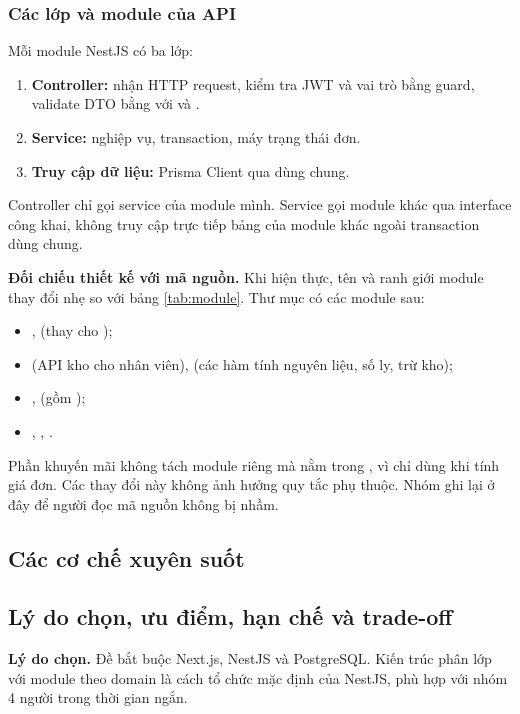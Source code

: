 \subsubsection{Các lớp và module của API}
Mỗi module NestJS có ba lớp:
\begin{enumerate}
\item \textbf{Controller:} nhận HTTP request, kiểm tra JWT và vai trò bằng guard, validate DTO bằng  với  và .
\item \textbf{Service:} nghiệp vụ, transaction, máy trạng thái đơn.
\item \textbf{Truy cập dữ liệu:} Prisma Client qua  dùng chung.
\end{enumerate}

Controller chỉ gọi service của module mình. Service gọi module khác qua interface công khai, không truy cập trực tiếp bảng của module khác ngoài transaction dùng chung.



\textbf{Đối chiếu thiết kế với mã nguồn.} Khi hiện thực, tên và ranh giới module thay đổi nhẹ so với bảng \ref{tab:module}. Thư mục  có các module sau:
\begin{itemize}
\item {},  (thay cho );
\item {} (API kho cho nhân viên),  (các hàm tính nguyên liệu, số ly, trừ kho);
\item {},  (gồm );
\item {}, , .
\end{itemize}

Phần khuyến mãi không tách module riêng mà nằm trong , vì chỉ dùng khi tính giá đơn. Các thay đổi này không ảnh hưởng quy tắc phụ thuộc. Nhóm ghi lại ở đây để người đọc mã nguồn không bị nhầm.

\subsection{Các cơ chế xuyên suốt}


\subsection{Lý do chọn, ưu điểm, hạn chế và trade-off}
\textbf{Lý do chọn.} Đề bắt buộc Next.js, NestJS và PostgreSQL. Kiến trúc phân lớp với module theo domain là cách tổ chức mặc định của NestJS, phù hợp với nhóm 4 người trong thời gian ngắn.


